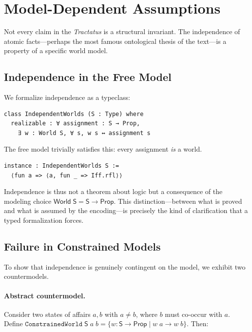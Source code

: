 \documentclass[10pt, letterpaper]{article}
\theoremstyle{definition}
\theoremstyle{remark}
\newcommand{\Sach}{\mathsf{S}}
\newcommand{\World}{\mathsf{World}}
\newcommand{\Prop}{\mathsf{Prop}}
\begin{document}
\section{Model-Dependent Assumptions}
\label{sec:assumptions}

Not every claim in the \emph{Tractatus} is a structural
invariant.  The independence of atomic facts---perhaps the most
famous ontological thesis of the text---is a property of a
specific world model.

\subsection{Independence in the Free Model}
\label{sec:independence}

We formalize independence as a typeclass:

\begin{lstlisting}
class IndependentWorlds (S : Type) where
  realizable : ∀ assignment : S → Prop,
    ∃ w : World S, ∀ s, w s ↔ assignment s
\end{lstlisting}

\noindent
The free model trivially satisfies this: every assignment
\emph{is} a world.

\begin{lstlisting}
instance : IndependentWorlds S :=
  ⟨fun a => ⟨a, fun _ => Iff.rfl⟩⟩
\end{lstlisting}

\noindent
Independence is thus not a theorem about logic but a consequence
of the modeling choice $\World\;\Sach = \Sach \to \Prop$.
This distinction---between what is proved and what is assumed by
the encoding---is precisely the kind of clarification that a
typed formalization forces.

\subsection{Failure in Constrained Models}
\label{sec:constrained}

To show that independence is genuinely contingent on the model,
we exhibit two countermodels.

\paragraph{Abstract countermodel.}
Consider two states of affairs $a, b$ with $a \neq b$, where
$b$ must co-occur with $a$.  Define
$\mathtt{ConstrainedWorld}\;\Sach\;a\;b = \{w : \Sach \to \Prop
\mid w\;a \to w\;b\}$.  Then:
\end{document}
